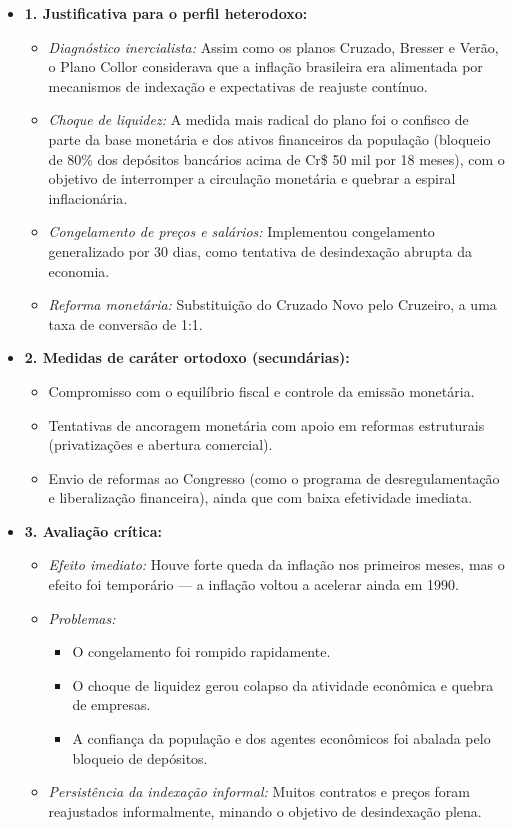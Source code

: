 \documentclass[a4paper,12pt]{article}[abntex2]
\begin{document}
\begin{itemize}
    \item \textbf{1. Justificativa para o perfil heterodoxo:}
    \begin{itemize}
        \item \textit{Diagnóstico inercialista:} Assim como os planos Cruzado, Bresser e Verão, o Plano Collor considerava que a inflação brasileira era alimentada por mecanismos de indexação e expectativas de reajuste contínuo.
        \item \textit{Choque de liquidez:} A medida mais radical do plano foi o confisco de parte da base monetária e dos ativos financeiros da população (bloqueio de 80\% dos depósitos bancários acima de Cr\$ 50 mil por 18 meses), com o objetivo de interromper a circulação monetária e quebrar a espiral inflacionária.
        \item \textit{Congelamento de preços e salários:} Implementou congelamento generalizado por 30 dias, como tentativa de desindexação abrupta da economia.
        \item \textit{Reforma monetária:} Substituição do Cruzado Novo pelo Cruzeiro, a uma taxa de conversão de 1:1.
    \end{itemize}

    \item \textbf{2. Medidas de caráter ortodoxo (secundárias):}
    \begin{itemize}
        \item Compromisso com o equilíbrio fiscal e controle da emissão monetária.
        \item Tentativas de ancoragem monetária com apoio em reformas estruturais (privatizações e abertura comercial).
        \item Envio de reformas ao Congresso (como o programa de desregulamentação e liberalização financeira), ainda que com baixa efetividade imediata.
    \end{itemize}

    \item \textbf{3. Avaliação crítica:}
    \begin{itemize}
        \item \textit{Efeito imediato:} Houve forte queda da inflação nos primeiros meses, mas o efeito foi temporário — a inflação voltou a acelerar ainda em 1990.
        \item \textit{Problemas:}
        \begin{itemize}
            \item O congelamento foi rompido rapidamente.
            \item O choque de liquidez gerou colapso da atividade econômica e quebra de empresas.
            \item A confiança da população e dos agentes econômicos foi abalada pelo bloqueio de depósitos.
        \end{itemize}
        \item \textit{Persistência da indexação informal:} Muitos contratos e preços foram reajustados informalmente, minando o objetivo de desindexação plena.
    \end{itemize}
\end{itemize}
\end{document}
